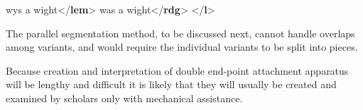 \begin{shaded}
\mbox{}\newline 
{}\mbox{}\newline 
\hspace*{1em}wys a wight{</\textbf{lem}>}\mbox{}\newline 
\hspace*{1em}was a wight{</\textbf{rdg}>}\mbox{}\newline 
{}\mbox{}\newline 
{</\textbf{l}>}\end{shaded}\egroup\par \noindent  The parallel segmentation method, to be discussed next, cannot handle overlaps among variants, and would require the individual variants to be split into pieces.\par
Because creation and interpretation of double end-point attachment apparatus will be lengthy and difficult it is likely that they will usually be created and examined by scholars only with mechanical assistance.
